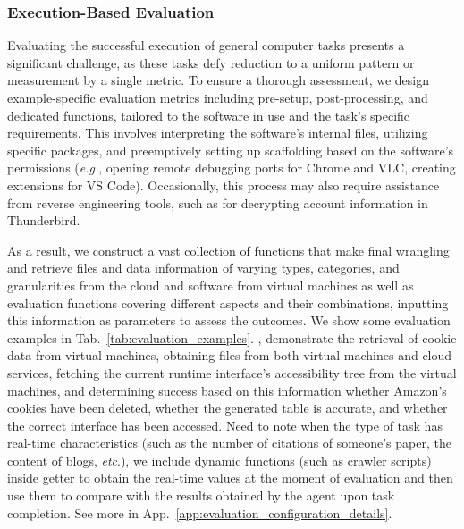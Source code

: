 \subsubsection{Execution-Based Evaluation}
\label{eval}

Evaluating the successful execution of general computer tasks presents a significant challenge, as these tasks defy reduction to a uniform pattern or measurement by a single metric. 
To ensure a thorough assessment, we design example-specific evaluation metrics including pre-setup, post-processing, and dedicated functions, tailored to the software in use and the task's specific requirements.
This involves interpreting the software's internal files, utilizing specific packages, and preemptively setting up scaffolding based on the software's permissions (\textit{e.g.}, opening remote debugging ports for Chrome and VLC, creating extensions for VS Code). 
Occasionally, this process may also require assistance from reverse engineering tools, such as for decrypting account information in Thunderbird.

As a result, we construct a vast collection of functions that make final wrangling and retrieve files and data information of varying types, categories, and granularities from the cloud and software from virtual machines as well as evaluation functions covering different aspects and their combinations, inputting this information as parameters to assess the outcomes.
We show some evaluation examples in Tab.~\ref{tab:evaluation_examples}.
, demonstrate the retrieval of cookie data from virtual machines, obtaining files from both virtual machines and cloud services, fetching the current runtime interface's accessibility tree from the virtual machines, and determining success based on this information whether Amazon's cookies have been deleted, whether the generated table is accurate, and whether the correct interface has been accessed.
Need to note when the type of task has real-time characteristics (such as the number of citations of someone's paper, the content of blogs, \textit{etc}.), we include dynamic functions (such as crawler scripts) inside getter to obtain the real-time values at the moment of evaluation and then use them to compare with the results obtained by the agent upon task completion.
See more in App.~\ref{app:evaluation_configuration_details}.

